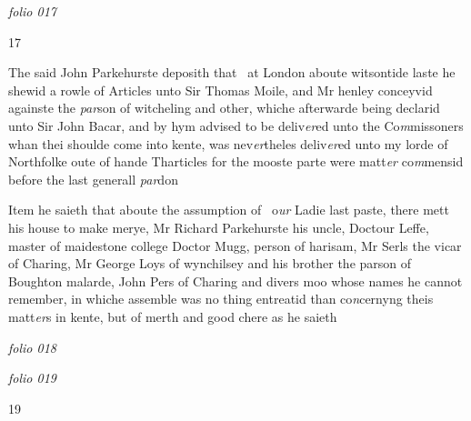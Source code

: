 \documentclass[12pt, a4paper]{book}
\begin{document}
\textit{folio 017}
			
			\begin{flushright}{\color{Mahogany}17}\end{flushright}
            		
		\ifthenelse{\isodd{\thepage}}
		{\reversemarginpar}
		{\normalmarginpar}
		The said John Parkehurste deposith that 
            			at London aboute witsontide laste he shewid
            			a rowle of Articles unto Sir Thomas
 	Moile, and Mr henley conceyvid againste
            			the \textit{par}son of witcheling and other, whiche
 afterwarde being declarid unto Sir John
 Bacar, and by hym advised to be deliv\textit{er}ed
 unto the Co\textit{m}missoners whan thei shoulde
 come into kente, was nev\textit{er}theles deliv\textit{er}ed
 unto my lorde of Northfolke oute of hande
 Tharticles for the mooste parte were matt\textit{er}
 co\textit{m}mensid before the last generall \textit{par}don
            		
            			
				\marginpar[\vspace{0.5cm}{\textcolor{Gray}{John Parkehurste of Leneham in kente}}]{}
			
            			
		\ifthenelse{\isodd{\thepage}}
		{\reversemarginpar}
		{\normalmarginpar}
		Item he saieth that aboute the assumption of 
 o\textit{ur} Ladie last paste, there mett  his house to
            				make merye, Mr Richard Parkehurste his
            				uncle, Doctour Leffe, master of maidestone college
            				Doctor Mugg, person of harisam, Mr Serls
 the vicar of Charing, Mr George Loys of
 wynchilsey and his brother the parson of
 	Boughton malarde, John Pers of Charing
 and divers moo whose names he cannot
 remember, in whiche assemble was no
 thing entreatid than co\textit{n}cernyng theis matt\textit{er}s
 in kente, but of merth and good chere as he
 saieth
 

\dotfill
					

\textit{folio 018}
		
      		\vspace{4cm}
         
      	
\dotfill
					

\textit{folio 019}
		
		\begin{flushright}{\color{Mahogany}19}\end{flushright}
      		\vspace{4cm}
\end{document}
